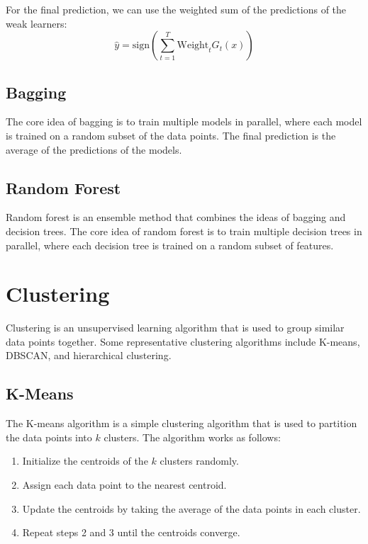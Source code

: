 \documentclass[a4paper,12pt]{article}
\begin{document}
For the final prediction, we can use the weighted sum of the predictions of the weak learners:
\begin{equation*}
  \hat{y} = \text{sign}\left(\sum_{t=1}^{T} \text{Weight}_t G_t(x)\right)
\end{equation*}

\subsection{Bagging}

The core idea of bagging is to train multiple models in parallel, where each model is trained on a random subset of the data points. The final prediction is the average of the predictions of the models.

\subsection{Random Forest}

Random forest is an ensemble method that combines the ideas of bagging and decision trees. The core idea of random forest is to train multiple decision trees in parallel, where each decision tree is trained on a random subset of features.

\section{Clustering}

Clustering is an unsupervised learning algorithm that is used to group similar data points together. Some representative clustering algorithms include K-means, DBSCAN, and hierarchical clustering.

\subsection{K-Means}

The K-means algorithm is a simple clustering algorithm that is used to partition the data points into $k$ clusters. The algorithm works as follows:
\begin{enumerate}
  \item Initialize the centroids of the $k$ clusters randomly.
  \item Assign each data point to the nearest centroid.
  \item Update the centroids by taking the average of the data points in each cluster.
  \item Repeat steps 2 and 3 until the centroids converge.
\end{enumerate}
\end{document}

